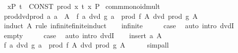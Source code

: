 \begin{isabellebody}
\isamarkupfalse%
\isanewline
\ \ {\isachardoublequoteopen}{\isasymProd}x{\isacharbar}{\kern0pt}P{\isachardot}{\kern0pt}\ t{\isachardoublequoteclose}\ {\isacharequal}{\kern0pt}{\isachargreater}{\kern0pt}\ {\isachardoublequoteopen}CONST\ prod\ {\isacharparenleft}{\kern0pt}{\isasymlambda}x{\isachardot}{\kern0pt}\ t{\isacharparenright}{\kern0pt}\ {\isacharbraceleft}{\kern0pt}x{\isachardot}{\kern0pt}\ P{\isacharbraceright}{\kern0pt}{\isachardoublequoteclose}\isanewline
\isanewline
{}\isamarkupfalse%
\ comm{\isacharunderscore}{\kern0pt}monoid{\isacharunderscore}{\kern0pt}mult\isanewline
{}\isanewline
\isanewline
{}\isamarkupfalse%
\ prod{\isacharunderscore}{\kern0pt}dvd{\isacharunderscore}{\kern0pt}prod{\isacharcolon}{\kern0pt}\ {\isachardoublequoteopen}{\isacharparenleft}{\kern0pt}{\isasymAnd}a{\isachardot}{\kern0pt}\ a\ {\isasymin}\ A\ {\isasymLongrightarrow}\ f\ a\ dvd\ g\ a{\isacharparenright}{\kern0pt}\ {\isasymLongrightarrow}\ prod\ f\ A\ dvd\ prod\ g\ A{\isachardoublequoteclose}\isanewline
%
\isadelimproof
%
\endisadelimproof
%
\isatagproof
{}\isamarkupfalse%
\ {\isacharparenleft}{\kern0pt}induct\ A\ rule{\isacharcolon}{\kern0pt}\ infinite{\isacharunderscore}{\kern0pt}finite{\isacharunderscore}{\kern0pt}induct{\isacharparenright}{\kern0pt}\isanewline
\ \ \isamarkupfalse%
\ infinite\isanewline
\ \ \isamarkupfalse%
\ \isamarkupfalse%
\ {\isacharquery}{\kern0pt}case\ \isamarkupfalse%
\ {\isacharparenleft}{\kern0pt}auto\ intro{\isacharcolon}{\kern0pt}\ dvdI{\isacharparenright}{\kern0pt}\isanewline
{}\isamarkupfalse%
\isanewline
\ \ \isamarkupfalse%
\ empty\isanewline
\ \ \isamarkupfalse%
\ \isamarkupfalse%
\ {\isacharquery}{\kern0pt}case\ \isamarkupfalse%
\ {\isacharparenleft}{\kern0pt}auto\ intro{\isacharcolon}{\kern0pt}\ dvdI{\isacharparenright}{\kern0pt}\isanewline
{}\isamarkupfalse%
\isanewline
\ \ \isamarkupfalse%
\ {\isacharparenleft}{\kern0pt}insert\ a\ A{\isacharparenright}{\kern0pt}\isanewline
\ \ \isamarkupfalse%
\ \isamarkupfalse%
\ {\isachardoublequoteopen}f\ a\ dvd\ g\ a{\isachardoublequoteclose}\ \ {\isachardoublequoteopen}prod\ f\ A\ dvd\ prod\ g\ A{\isachardoublequoteclose}\isanewline
\ \ \ \ \isamarkupfalse%
\ simp{\isacharunderscore}{\kern0pt}all\isanewline
\ \ \isamarkupfalse%
\ \isamarkupfalse%

\end{isabellebody}
